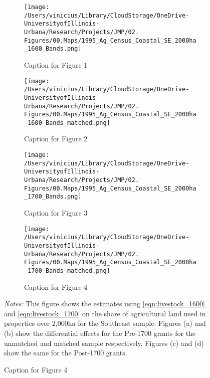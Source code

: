 \documentclass[11pt]{article}
\begin{document}
\clearpage

\begin{landscape}
  \begin{figure}[htbp]
    \centering
    \caption{Effects of Coastal Ban with Varying Cutoffs on Agricultural Land on Properties over 2,000ha - Southeast Sample}
    \begin{subfigure}[b]{0.65\textwidth}
        \centering
        \texttt{[image: /Users/vinicius/Library/CloudStorage/OneDrive-UniversityofIllinois-Urbana/Research/Projects/JMP/02. Figures/00.Maps/1995\_Ag\_Census\_Coastal\_SE\_2000ha\_1600\_Bands.png]}
        \caption{Caption for Figure 1}
        \label{fig:fig1}
    \end{subfigure}
    \hfill
    \begin{subfigure}[b]{0.65\textwidth}
        \centering
        \texttt{[image: /Users/vinicius/Library/CloudStorage/OneDrive-UniversityofIllinois-Urbana/Research/Projects/JMP/02. Figures/00.Maps/1995\_Ag\_Census\_Coastal\_SE\_2000ha\_1600\_Bands\_matched.png]}
        \caption{Caption for Figure 2}
        \label{fig:fig2}
    \end{subfigure}

    \vspace{0.1cm} %

    \begin{subfigure}[b]{0.65\textwidth}
        \centering
        \texttt{[image: /Users/vinicius/Library/CloudStorage/OneDrive-UniversityofIllinois-Urbana/Research/Projects/JMP/02. Figures/00.Maps/1995\_Ag\_Census\_Coastal\_SE\_2000ha\_1700\_Bands.png]}
        \caption{Caption for Figure 3}
        \label{fig:fig3}
    \end{subfigure}
    \hfill
    \begin{subfigure}[b]{0.65\textwidth}
        \centering
        \texttt{[image: /Users/vinicius/Library/CloudStorage/OneDrive-UniversityofIllinois-Urbana/Research/Projects/JMP/02. Figures/00.Maps/1995\_Ag\_Census\_Coastal\_SE\_2000ha\_1700\_Bands\_matched.png]}
        \caption{Caption for Figure 4}
        \label{fig:fig4}
    \end{subfigure}

    \vspace{0.5cm}
    \justifying
    \noindent \textit{Notes:} This figure shows the estimates using \autoref{eqn:livestock_1600} and \autoref{eqn:livestock_1700} on the share of agricultural land used in properties over 2,000ha for the Southeast sample. Figures (a) and (b) show the differential effects for the Pre-1700 grants for the unmatched and matched sample respectively. Figures (c) and (d) show the same for the Post-1700 grants.
    \label{fig:robustness_SE_landsize_distance_cutoff}
    
\end{figure}
\end{landscape}
\end{document}
